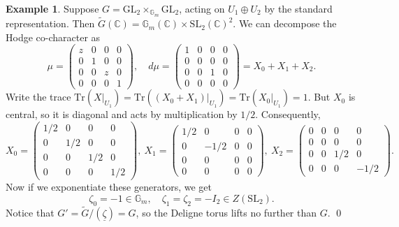 \documentclass[12pt]{amsart}
\newcommand{\C}{\mathbb{C}}
\newcommand{\SL}{\mathrm{SL}}
\newcommand{\GL}{\mathrm{GL}}
\newcommand{\ul}{\underline}
\newcommand{\wt}{\widetilde}
\theoremstyle{definition}
\newtheorem{example}[theorem]{Example}
\numberwithin{equation}{section}
\begin{document}
\begin{example}
Suppose \(G = \GL_2 \times_{\mathbb{G}_m} \GL_2\), acting on \(U_1 \oplus U_2\) by the 
standard representation. Then \(\wt{G}(\C) = \mathbb{G}_m(\C) \times \SL_2(\C)^2\). 
We can decompose the Hodge co-character as 
\begin{equation*}
    \mu = \begin{pmatrix}
        z & 0 & 0 & 0 \\
        0 & 1 & 0 & 0 \\
        0 & 0 & z & 0 \\
        0 & 0 & 0 & 1
    \end{pmatrix},\quad d\mu = \begin{pmatrix}
        1 & 0 & 0 & 0 \\
        0 & 0 & 0 & 0 \\
        0 & 0 & 1 & 0 \\
        0 & 0 & 0 & 0
    \end{pmatrix} = X_0 + X_1 + X_2.
\end{equation*}
Write the trace \(\mathrm{Tr}(X|_{U_1}) = \mathrm{Tr}((X_0 + X_1)|_{U_1}) 
= \mathrm{Tr}(X_0|_{U_1}) = 1\).
But \(X_0\) is central, so it is diagonal and acts by multiplication by \(1/2\).
Consequently,
\begin{equation*}
    X_0 = \begin{pmatrix}
        1/2 & 0 & 0 & 0 \\
        0 & 1/2 & 0 & 0 \\
        0 & 0 & 1/2 & 0 \\
        0 & 0 & 0 & 1/2
    \end{pmatrix},\  X_1 = \begin{pmatrix}
        1/2 & 0 & 0 & 0 \\
        0 & -1/2 & 0 & 0 \\
        0 & 0 & 0 & 0 \\
        0 & 0 & 0 & 0
    \end{pmatrix},\  X_2 = \begin{pmatrix}
        0 & 0 & 0 & 0 \\
        0 & 0 & 0 & 0 \\
        0 & 0 & 1/2 & 0 \\
        0 & 0 & 0 & -1/2
    \end{pmatrix}.
\end{equation*}
Now if we exponentiate these generators, we get 
\begin{equation*}
    \zeta_0 = -1 \in \mathbb{G}_m,\quad \zeta_1 = \zeta_2 = -I_2 \in Z(\SL_2).
\end{equation*}
Notice that \(G' = \wt{G}/(\ul{\zeta}) = G\), so the Deligne torus lifts no further
than \(G\). 
\qed
\end{example}
\end{document}
